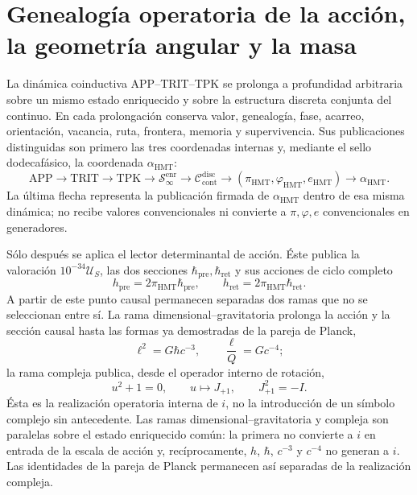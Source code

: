 
\section{Genealogía operatoria de la acción, la geometría angular y la masa}
\label{sec:l9s102:transicion-constantes-accion-geometria-masas}

La dinámica coinductiva APP--TRIT--TPK se prolonga a profundidad arbitraria
sobre un mismo estado enriquecido y sobre la estructura discreta conjunta del
continuo. En cada prolongación conserva valor, genealogía, fase, acarreo,
orientación, vacancia, ruta, frontera, memoria y supervivencia. Sus
publicaciones distinguidas son primero las tres coordenadas internas y,
mediante el sello dodecafásico, la coordenada \(\alpha_{\mathrm{HMT}}\):
\[
 \mathrm{APP}\longrightarrow\mathrm{TRIT}\longrightarrow\mathrm{TPK}
 \longrightarrow\mathcal S_{\infty}^{\mathrm{enr}}
 \longrightarrow\mathcal C_{\mathrm{cont}}^{\mathrm{disc}}
 \longrightarrow(\pi_{\mathrm{HMT}},\varphi_{\mathrm{HMT}},e_{\mathrm{HMT}})
 \longrightarrow\alpha_{\mathrm{HMT}}.
\]
La última flecha representa la publicación firmada de
\(\alpha_{\mathrm{HMT}}\) dentro de esa misma dinámica; no recibe valores
convencionales ni convierte a \(\pi,\varphi,e\) convencionales en generadores.

Sólo después se aplica el lector determinantal de acción. Éste publica la
valoración \(10^{-34}\mathcal U_S\), las dos secciones
\(\hbar_{\mathrm{pre}},\hbar_{\mathrm{ret}}\) y sus acciones de ciclo
completo
\[
 h_{\mathrm{pre}}=2\pi_{\mathrm{HMT}}\hbar_{\mathrm{pre}},
 \qquad
 h_{\mathrm{ret}}=2\pi_{\mathrm{HMT}}\hbar_{\mathrm{ret}}.
\]
A partir de este punto causal permanecen separadas dos ramas que no se
seleccionan entre sí. La rama dimensional--gravitatoria prolonga la acción y
la sección causal hasta las formas ya demostradas de la pareja de Planck,
\[
 \ell^{2}=G\hbar c^{-3},
 \qquad
 \frac{\ell}{Q}=Gc^{-4};
\]
la rama compleja publica, desde el operador interno de rotación,
\[
 u^2+1=0,
 \qquad u\longmapsto J_{+1},
 \qquad J_{+1}^{2}=-I.
\]
Ésta es la realización operatoria interna de \(i\), no la introducción de un
símbolo complejo sin antecedente. Las ramas dimensional--gravitatoria y
compleja son paralelas sobre el estado enriquecido común: la primera no
convierte a \(i\) en entrada de la escala de acción y, recíprocamente,
\(h\), \(\hbar\), \(c^{-3}\) y \(c^{-4}\) no generan a \(i\). Las identidades
de la pareja de Planck permanecen así separadas de la realización compleja.

